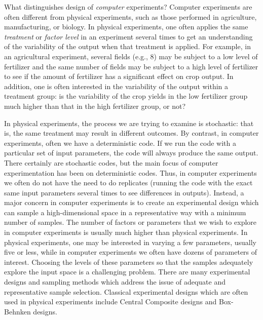What distinguishes design of {\em computer} experiments?  Computer
experiments are often different from physical experiments, such as
those performed in agriculture, manufacturing, or biology.  In
physical experiments, one often applies the same \emph{treatment} or
\emph{factor level} in an experiment several times to get an
understanding of the variability of the output when that treatment is
applied.  For example, in an agricultural experiment, several fields
(e.g., 8) may be subject to a low level of fertilizer and the same
number of fields may be subject to a high level of fertilizer to see
if the amount of fertilizer has a significant effect on crop
output. In addition, one is often interested in the variability of the
output within a treatment group: is the variability of the crop yields
in the low fertilizer group much higher than that in the high
fertilizer group, or not?

In physical experiments, the process we are trying to examine is stochastic:  
that is, the same treatment may result in different outcomes.  
By contrast, in computer experiments, often we have a deterministic code.  
If we run the code with a particular set of input parameters, the code 
will always produce the same output.  There certainly are stochastic codes, 
but the main focus of computer experimentation has been on deterministic codes. 
Thus, in computer experiments we often do not have the need to do replicates 
(running the code with the exact same input parameters several times to see 
differences in outputs).  Instead, a major concern in computer experiments is 
to create an experimental design which can sample a high-dimensional space 
in a representative way with a minimum number of samples.   
The number of factors or parameters that we wish to explore in computer 
experiments is usually much higher than physical experiments.  
In physical experiments, one may be interested in varying a few parameters, 
usually five or less, while in computer experiments we often have 
dozens of parameters of interest.  Choosing the levels of these parameters 
so that the samples adequately explore the input space is a challenging 
problem.  There are many experimental designs and sampling methods 
which address the issue of adequate and representative sample selection. 
Classical experimental designs which are often used in physical experiments 
include Central Composite designs and Box-Behnken designs.

